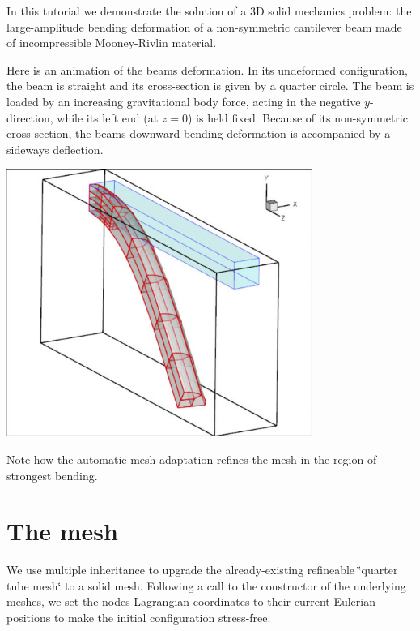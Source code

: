 In this tutorial we demonstrate the solution of a 3D solid mechanics problem\+: the large-\/amplitude bending deformation of a non-\/symmetric cantilever beam made of incompressible Mooney-\/\+Rivlin material.

Here is an animation of the beam\textquotesingle{}s deformation. In its undeformed configuration, the beam is straight and its cross-\/section is given by a quarter circle. The beam is loaded by an increasing gravitational body force, acting in the negative $ y$-\/direction, while its left end (at $ z=0 $) is held fixed. Because of its non-\/symmetric cross-\/section, the beam\textquotesingle{}s downward bending deformation is accompanied by a sideways deflection.

 
\begin{DoxyImage}
\includegraphics[width=0.75\textwidth]{cantilever}
\end{DoxyImage}


Note how the automatic mesh adaptation refines the mesh in the region of strongest bending.



 

\hypertarget{index_mesh}{}\section{The mesh}\label{index_mesh}
We use multiple inheritance to upgrade the already-\/existing refineable \char`\"{}quarter tube mesh\char`\"{} to a solid mesh. Following a call to the constructor of the underlying meshes, we set the nodes\textquotesingle{} Lagrangian coordinates to their current Eulerian positions to make the initial configuration stress-\/free.


